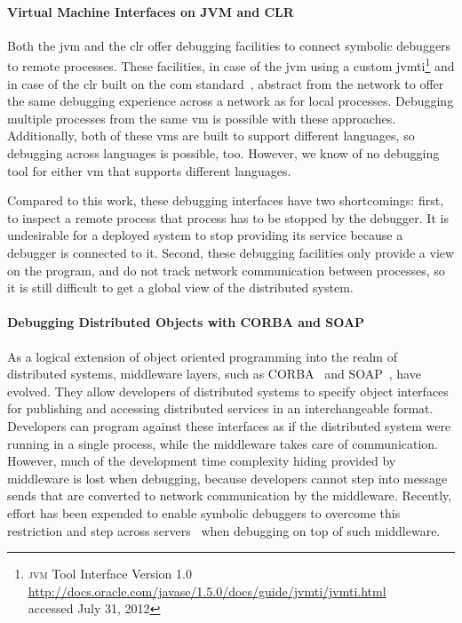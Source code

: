 \paragraph{Virtual Machine Interfaces on JVM and CLR}
\label{sec:java}

Both the \ac{jvm} and the \ac{clr} offer debugging facilities to
connect symbolic debuggers to remote processes. These facilities, in
case of the \ac{jvm} using a custom \ac{jvmti}\footnote{\textsc{jvm}
  Tool Interface Version 1.0\\
  \url{http://docs.oracle.com/javase/1.5.0/docs/guide/jvmti/jvmti.html}\\
  accessed July 31, 2012} and in case of the \ac{clr} built on the
\ac{com} standard~\cite{Strein2005}, abstract from the network to
offer the same debugging experience across a network as for local
processes. Debugging multiple processes from the same \ac{vm} is
possible with these approaches. Additionally, both of these \acp{vm}
are built to support different languages, so debugging across
languages is possible, too. However, we know of no debugging tool for
either \ac{vm} that supports different languages.

Compared to this work, these debugging interfaces have two
shortcomings: first, to inspect a remote process that process has to
be stopped by the debugger. It is undesirable for a deployed system to
stop providing its service because a debugger is connected to
it. Second, these debugging facilities only provide a view on the
program, and do not track network communication between processes, so
it is still difficult to get a global view of the distributed system.

\paragraph{Debugging Distributed Objects with CORBA and SOAP}
\label{sec:corba}

As a logical extension of object oriented programming into the realm
of distributed systems, middleware layers, such as
CORBA~\cite{Yang1996} and SOAP~\cite{Walsh2002}, have evolved. They
allow developers of distributed systems to specify object interfaces
for publishing and accessing distributed services in an
interchangeable format. Developers can program against these
interfaces as if the distributed system were running in a single
process, while the middleware takes care of communication. However,
much of the development time complexity hiding provided by middleware
is lost when debugging, because developers cannot step into message
sends that are converted to network communication by the
middleware. Recently, effort has been expended to enable symbolic
debuggers to overcome this restriction and step across
servers~\cite{Mega,Kaler2007} when debugging on top of such
middleware.

